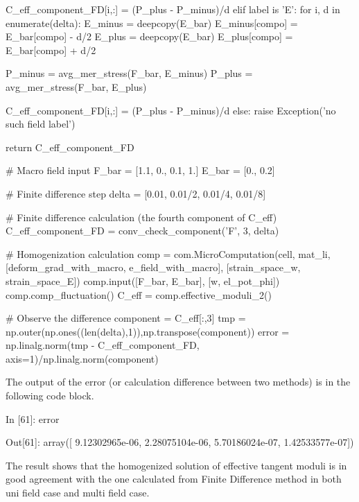 \begin{python}
            C_eff_component_FD[i,:] = (P_plus - P_minus)/d
    elif label is 'E':
        for i, d in enumerate(delta):
            E_minus = deepcopy(E_bar)
            E_minus[compo] = E_bar[compo] - d/2
            E_plus = deepcopy(E_bar)
            E_plus[compo] = E_bar[compo] + d/2

            P_minus = avg_mer_stress(F_bar, E_minus)
            P_plus  = avg_mer_stress(F_bar, E_plus)
            
            C_eff_component_FD[i,:] = (P_plus - P_minus)/d
    else:
        raise Exception('no such field label')
    
    return C_eff_component_FD 

# Macro field input
F_bar = [1.1, 0., 0.1, 1.]
E_bar = [0., 0.2]

# Finite difference step
delta = [0.01, 0.01/2, 0.01/4, 0.01/8]

# Finite difference calculation (the fourth component of C_eff)
C_eff_component_FD = conv_check_component('F', 3, delta)

# Homogenization calculation 
comp = com.MicroComputation(cell, mat_li,
                        [deform_grad_with_macro, e_field_with_macro],
                        [strain_space_w, strain_space_E])
comp.input([F_bar, E_bar], [w, el_pot_phi])
comp.comp_fluctuation()
C_eff = comp.effective_moduli_2()

# Observe the difference
component = C_eff[:,3]
tmp = np.outer(np.ones((len(delta),1)),np.transpose(component))
error = np.linalg.norm(tmp - C_eff_component_FD, axis=1)/np.linalg.norm(component)
\end{python}

The output of the error (or calculation difference between two methods) is in the following code block.
\begin{python}
In [61]: error

Out[61]:
array([  9.12302965e-06,   2.28075104e-06,   5.70186024e-07,
         1.42533577e-07])
\end{python}

The result shows that the homogenized solution of effective tangent moduli is in good agreement with the one calculated from Finite Difference method in both uni field case and multi field case. 

%
%
